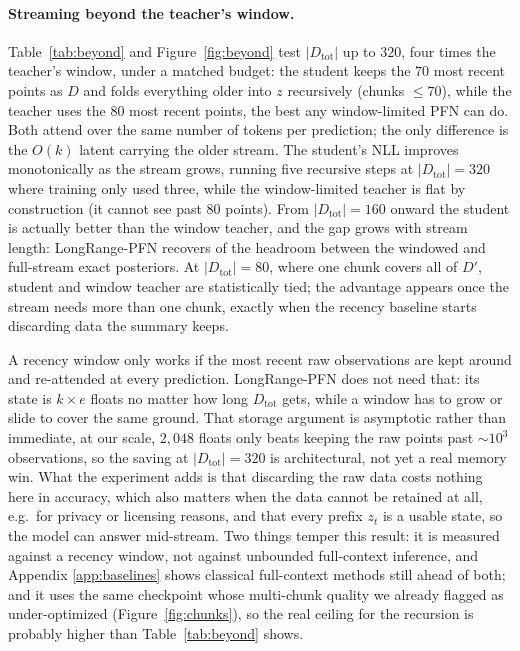\documentclass[11pt]{article}
\newcommand{\Dtot}{D_{\mathrm{tot}}}
\newcommand{\Dfar}{D'}
\newcommand{\Dloc}{D}
\begin{document}
\paragraph{Streaming beyond the teacher's window.} Table~\ref{tab:beyond}
and Figure~\ref{fig:beyond} test $|\Dtot|$ up to $320$, four times the
teacher's window, under a matched budget: the student keeps the $70$ most
recent points as $\Dloc$ and folds everything older into $z$ recursively
(chunks $\le 70$), while the teacher uses the $80$ most recent points, the
best any window-limited PFN can do. Both attend over the same number of
tokens per prediction; the only difference is the $O(k)$ latent carrying
the older stream. The student's NLL improves monotonically as the stream
grows, running five recursive steps at $|\Dtot|=320$ where training only
used three, while the window-limited teacher is flat by construction (it
cannot see past $80$ points). From $|\Dtot|=160$ onward the student is
actually better than the window teacher, and the gap grows with stream
length: LongRange-PFN recovers \beyondgainpct{} of the headroom between the
windowed and full-stream exact posteriors. At $|\Dtot|=80$, where one chunk
covers all of $\Dfar$, student and window teacher are statistically tied;
the advantage appears once the stream needs more than one chunk, exactly
when the recency baseline starts discarding data the summary keeps.

A recency window only works if the most recent raw observations are
kept around and re-attended at every prediction. LongRange-PFN does not
need that: its state is $k \times e$ floats no matter how long $\Dtot$
gets, while a window has to grow or slide to cover the same ground. That
storage argument is asymptotic rather than immediate, at our scale,
$2{,}048$ floats only beats keeping the raw points past
$\sim\!10^3$ observations, so the saving at $|\Dtot|=320$ is architectural,
not yet a real memory win. What the experiment adds is that discarding the
raw data costs nothing here in accuracy, which also matters when the data
cannot be retained at all, e.g.\ for privacy or licensing reasons, and that
every prefix $z_t$ is a usable state, so the model can answer mid-stream.
Two things temper this result: it is measured against a recency window,
not against unbounded full-context inference, and Appendix
\ref{app:baselines} shows classical full-context methods still ahead of
both; and it uses the same checkpoint whose multi-chunk quality we already
flagged as under-optimized (Figure~\ref{fig:chunks}), so the real ceiling
for the recursion is probably higher than Table~\ref{tab:beyond} shows.
\end{document}
